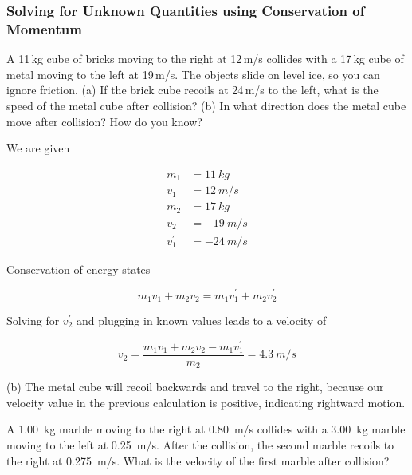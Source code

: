 \documentclass[]{exam}
\begin{document}
\subsubsection{Solving for Unknown Quantities using Conservation of Momentum}

\clearpage

\begin{questions}
\question
A 11\,kg cube of bricks moving to the right at 12\,m/s collides with a 17\,kg cube of metal moving to the left at 19\,m/s. The objects slide on level ice, so you can ignore friction. (a) If the brick cube recoils at 24\,m/s to the left, what is the speed of the metal cube after collision? (b) In what direction does the metal cube move after collision? How do you know?


\begin{solution}
We are given 

\vspace{-1em}
\begin{align*}
    m_1 &= \SI{11}{kg} \\[1ex]
    v_1 &= \SI{12}{m/s} \\[1ex]
    m_2 &= \SI{17}{kg} \\[1ex]
    v_2 &= \SI{-19}{m/s} \\[1ex]
    v_1^{\prime} &= \SI{-24}{m/s}
\end{align*}

Conservation of energy states

\begin{equation*}
    m_1v_1 + m_2 v_2 = m_1 v_1^{\prime} + m_2 v_2^{\prime}
\end{equation*}

Solving for $v_2^{\prime}$ and plugging in known values leads to a velocity of

\begin{equation*}
    v_2 = \frac{m_1 v_1 + m_2 v_2 - m_1 v_1^{\prime}}{m_2} = \boxed{\SI{4.3}{m/s}}
\end{equation*}

(b) The metal cube will recoil backwards and travel to the right, because our velocity value in the previous calculation is positive, indicating rightward motion.
\end{solution}

\question
A \SI{1.00}{kg} marble moving to the right at \SI{0.80}{m/s} collides with a \SI{3.00}{kg} marble moving to the left at \SI{0.25}{m/s}. After the collision, the second marble recoils to the right at \SI{0.275}{m/s}. What is the velocity of the first marble after collision? 


\end{questions}
\end{document}
